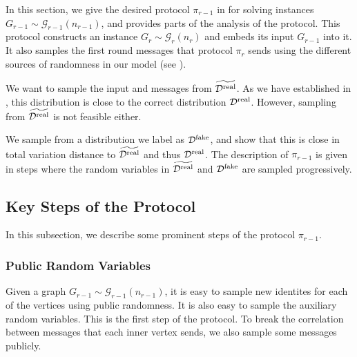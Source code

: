 \documentclass[11pt]{article}
\theoremstyle{definition}
\newcommand{\prot}{\ensuremath{\pi}}
\newcommand{\cD}{\ensuremath{\mathcal{D}}}
\newcommand{\cG}{\ensuremath{\mathcal{G}}}
\newcommand{\cDreal}{\ensuremath{\cD^{\textnormal{real}}}}
\newcommand{\cDrealtil}{\ensuremath{\widetilde{\cDreal}}}
\newcommand{\cDfake}{\ensuremath{\cD^{\textnormal{fake}}}}
\begin{document}
In this section, we give the desired protocol $\prot_{r-1}$ in  for solving instances $G_{r-1} \sim \cG_{r-1}(n_{r-1})$, and provides parts of the analysis of the protocol.
This protocol constructs an instance $G_r \sim \cG_r(n_r)$ and embeds its input $G_{r-1}$ into it. It also samples the first round messages that protocol $\prot_r$ sends using the different sources of randomness in our model (see ).

We want to sample the input and messages from $\cDrealtil$. As we have established in , this distribution is close to the correct distribution $\cDreal$. However, sampling from $\cDrealtil$ is not feasible either. 

We sample from a distribution we label as $\cDfake$, and show that this is close in total variation distance to $\cDrealtil$ and thus $\cDreal$. 
The description of $\prot_{r-1}$ is given in steps where the random variables in $\cDrealtil$ and $\cDfake$ are sampled progressively.


\subsection{Key Steps of the Protocol}
In this subsection, we describe some prominent steps of the protocol $\prot_{r-1}$. 


\subsubsection{Public Random Variables}
Given a graph $G_{r-1} \sim\cG_{r-1}(n_{r-1})$, it is easy to sample new identites for each of the vertices using public randomness. It is also easy to sample the auxiliary random variables. This is the first step of the protocol. 
To break the correlation between messages that each inner vertex sends, we also sample some messages publicly. 
\end{document}
